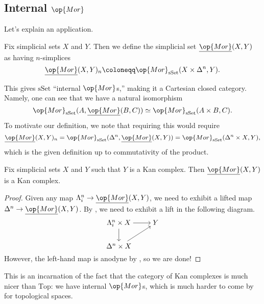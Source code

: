 \documentclass[../notes.tex]{subfiles}
\begin{document}
\subsection{Internal \texorpdfstring{$\op{Mor}$}{ Mor}}
Let's explain an application.
\begin{definition}
	Fix simplicial sets $X$ and $Y$. Then we define the simplicial set $\underline{\op{Mor}}(X,Y)$ as having $n$-simplices
	\[\underline{\op{Mor}}(X,Y)_n\coloneqq\op{Mor}_{\mathrm{sSet}}(X\times\Delta^n,Y).\]
\end{definition}
\begin{remark} \label{rem:curry}
	This gives $\mathrm{sSet}$ ``internal $\op{Mor}$s,'' making it a Cartesian closed category. Namely, one can see that we have a natural isomorphism
	\[\op{Mor}_{\mathrm{sSet}}(A,\underline{\op{Mor}}(B,C))\simeq\op{Mor}_{\mathrm{sSet}}(A\times B,C).\]
	To motivate our definition, we note that requiring this would require
	\[\underline{\op{Mor}}(X,Y)_n=\op{Mor}_{\mathrm{sSet}}(\Delta^n,\underline{\op{Mor}}(X,Y))=\op{Mor}_{\mathrm{sSet}}(\Delta^n\times X,Y),\]
	which is the given definition up to commutativity of the product.
\end{remark}
\begin{proposition}
	Fix simplicial sets $X$ and $Y$ such that $Y$ is a Kan complex. Then $\underline{\op{Mor}}(X,Y)$ is a Kan complex.
\end{proposition}
\begin{proof}
	Given any map $\Lambda^n_i\to\underline{\op{Mor}}(X,Y)$, we need to exhibit a lifted map $\Delta^n\to\underline{\op{Mor}}(X,Y)$. By , we need to exhibit a lift in the following diagram.
	\[\begin{tikzcd}[cramped]
		{\Lambda_i^n\times X} & Y \\
		{\Delta^n\times X}
		\arrow[from=1-1, to=1-2]
		\arrow[from=1-1, to=2-1]
		\arrow[from=2-1, to=1-2]
	\end{tikzcd}\]
	However, the left-hand map is anodyne by , so we are done!
\end{proof}
\begin{remark}
	This is an incarnation of the fact that the category of Kan complexes is much nicer than $\mathrm{Top}$: we have internal $\op{Mor}$s, which is much harder to come by for topological spaces.
\end{remark}
\end{document}
